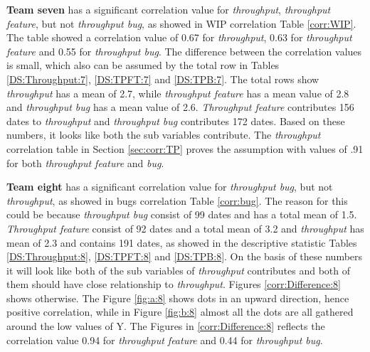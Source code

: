 \documentclass[UKenglish]{ifimaster}  %
\begin{document}
\textbf{Team seven} has a significant correlation value for \textit{throughput}, \textit{throughput feature}, but not \textit{throughput bug}, as showed in WIP correlation Table \ref{corr:WIP}. The table showed a correlation value of 0.67 for \textit{throughput}, 0.63 for \textit{throughput feature} and 0.55 for \textit{throughput bug}. The difference between the correlation values is small, which also can be assumed by the total row in Tables \ref{DS:Throughput:7},  \ref{DS:TPFT:7} and \ref{DS:TPB:7}. The total rows show \textit{throughput} has a mean of 2.7, while \textit{throughput feature} has a mean value of 2.8 and \textit{throughput bug} has a mean value of 2.6. \textit{Throughput feature} contributes 156 dates to \textit{throughput} and \textit{throughput bug} contributes 172 dates. Based on these numbers, it looks like both the sub variables contribute. The \textit{throughput} correlation table in Section \ref{sec:corr:TP} proves the assumption with values of .91 for both \textit{throughput feature} and \textit{bug}.  

\textbf{Team eight} has a significant correlation value for \textit{throughput bug}, but not \textit{throughput}, as showed in bugs correlation Table \ref{corr:bug}. The reason for this could be because \textit{throughput bug} consist of 99 dates and has a total mean of 1.5. \textit{Throughput feature} consist of 92 dates and a total mean of 3.2 and \textit{throughput} has mean of 2.3 and contains 191 dates, as showed in the descriptive statistic Tables \ref{DS:Throughput:8}, \ref{DS:TPFT:8} and \ref{DS:TPB:8}.  On the basis of these numbers it will look like both of the sub variables of \textit{throughput} contributes and both of them should have close relationship to \textit{throughput}.  Figures \ref{corr:Difference:8} shows otherwise. The Figure \ref{fig:a:8} shows dots in an upward direction, hence positive correlation, while in Figure \ref{fig:b:8} almost all the dots are all gathered around the low values of Y. The Figures in \ref{corr:Difference:8} reflects the correlation value 0.94 for \textit{throughput feature} and 0.44 for \textit{throughput bug}.
\end{document}
